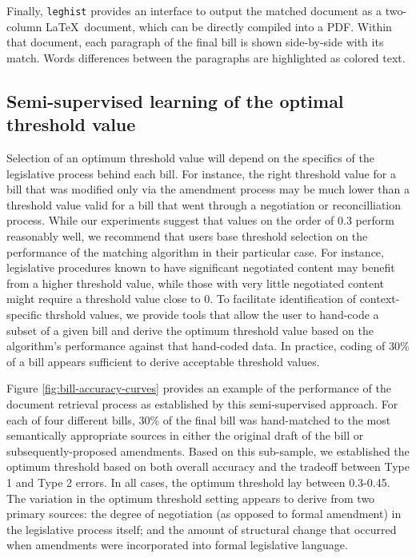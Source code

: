 \documentclass[11pt]{article}
\begin{document}
Finally, \texttt{leghist} provides an interface to output the matched
document as a two-column \LaTeX\ document, which can be directly
compiled into a PDF. Within that document, each paragraph of the final
bill is shown side-by-side with its match. Words differences between
the paragraphs are highlighted as colored text. 

\subsection{Semi-supervised learning of the optimal threshold value}
\label{sec:superv-learn-optim}

Selection of an optimum threshold value will depend on the specifics
of the legislative process behind each bill. For instance, the right
threshold value for a bill that was modified only via the amendment
process may be much lower than a threshold value valid for a bill that
went through a negotiation or reconcilliation process. While our experiments
suggest that values on the order of 0.3 perform reasonably well, we
recommend that users base threshold selection on the performance of
the matching algorithm in their particular case. For instance,
legislative procedures known to have significant negotiated content
may benefit from a higher threshold value, while those with very
little negotiated content might require a threshold value close to
0. To facilitate identification of context-specific thrshold values, we provide tools that allow the user to
hand-code a subset of a given bill and derive the optimum threshold
value based on the algorithm's performance against that hand-coded
data. In practice, coding of 30\% of a bill appears sufficient to
derive acceptable threshold values.

Figure \ref{fig:bill-accuracy-curves} provides an example of the
performance of the document retrieval process as established by this
semi-supervised approach. For each of four different bills, 30\% of
the final bill was hand-matched to the most semantically appropriate
sources in either the original draft of the bill or
subsequently-proposed amendments. Based on this sub-sample, we
established the optimum threshold based on both overall accuracy and
the tradeoff between Type 1 and Type 2 errors. In all cases, the
optimum threshold lay between 0.3-0.45. The variation in the optimum
threshold setting appears to derive from two primary sources: the
degree of negotiation (as opposed to formal amendment) in the
legislative process itself; and the amount of structural change that
occurred when amendments were incorporated into formal legislative language.
\end{document}
